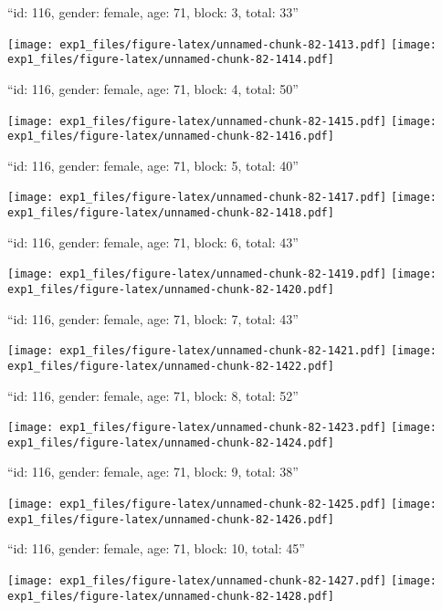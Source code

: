 \documentclass[11pt,,]{article}
\begin{document}
\newpage
[1] 

``id: 116, gender: female, age: 71, block: 3, total: 33''

\texttt{[image: exp1\_files/figure-latex/unnamed-chunk-82-1413.pdf]}
\texttt{[image: exp1\_files/figure-latex/unnamed-chunk-82-1414.pdf]}

\newpage
[1] 

``id: 116, gender: female, age: 71, block: 4, total: 50''

\texttt{[image: exp1\_files/figure-latex/unnamed-chunk-82-1415.pdf]}
\texttt{[image: exp1\_files/figure-latex/unnamed-chunk-82-1416.pdf]}

\newpage
[1] 

``id: 116, gender: female, age: 71, block: 5, total: 40''

\texttt{[image: exp1\_files/figure-latex/unnamed-chunk-82-1417.pdf]}
\texttt{[image: exp1\_files/figure-latex/unnamed-chunk-82-1418.pdf]}

\newpage
[1] 

``id: 116, gender: female, age: 71, block: 6, total: 43''

\texttt{[image: exp1\_files/figure-latex/unnamed-chunk-82-1419.pdf]}
\texttt{[image: exp1\_files/figure-latex/unnamed-chunk-82-1420.pdf]}

\newpage
[1] 

``id: 116, gender: female, age: 71, block: 7, total: 43''

\texttt{[image: exp1\_files/figure-latex/unnamed-chunk-82-1421.pdf]}
\texttt{[image: exp1\_files/figure-latex/unnamed-chunk-82-1422.pdf]}

\newpage
[1] 

``id: 116, gender: female, age: 71, block: 8, total: 52''

\texttt{[image: exp1\_files/figure-latex/unnamed-chunk-82-1423.pdf]}
\texttt{[image: exp1\_files/figure-latex/unnamed-chunk-82-1424.pdf]}

\newpage
[1] 

``id: 116, gender: female, age: 71, block: 9, total: 38''

\texttt{[image: exp1\_files/figure-latex/unnamed-chunk-82-1425.pdf]}
\texttt{[image: exp1\_files/figure-latex/unnamed-chunk-82-1426.pdf]}

\newpage
[1] 

``id: 116, gender: female, age: 71, block: 10, total: 45''

\texttt{[image: exp1\_files/figure-latex/unnamed-chunk-82-1427.pdf]}
\texttt{[image: exp1\_files/figure-latex/unnamed-chunk-82-1428.pdf]}
\end{document}
